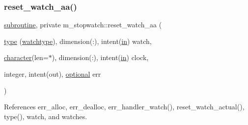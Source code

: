 \subsubsection{\texorpdfstring{reset\+\_\+watch\+\_\+aa()}{reset\_watch\_aa()}}
{\footnotesize\ttfamily \hyperlink{M__stopwatch_83_8txt_acfbcff50169d691ff02d4a123ed70482}{subroutine}, private m\+\_\+stopwatch\+::reset\+\_\+watch\+\_\+aa (\begin{DoxyParamCaption}\item[{\hyperlink{stop__watch_83_8txt_a70f0ead91c32e25323c03265aa302c1c}{type} (\hyperlink{structm__stopwatch_1_1watchtype}{watchtype}), dimension(\+:), intent(\hyperlink{M__journal_83_8txt_afce72651d1eed785a2132bee863b2f38}{in})}]{watch,  }\item[{\hyperlink{option__stopwatch_83_8txt_abd4b21fbbd175834027b5224bfe97e66}{character}(len=$\ast$), dimension(\+:), intent(\hyperlink{M__journal_83_8txt_afce72651d1eed785a2132bee863b2f38}{in})}]{clock,  }\item[{integer, intent(out), \hyperlink{option__stopwatch_83_8txt_aa4ece75e7acf58a4843f70fe18c3ade5}{optional}}]{err }\end{DoxyParamCaption})\hspace{0.3cm}{\ttfamily [private]}}



References err\+\_\+alloc, err\+\_\+dealloc, err\+\_\+handler\+\_\+watch(), reset\+\_\+watch\+\_\+actual(), type(), watch, and watches.

